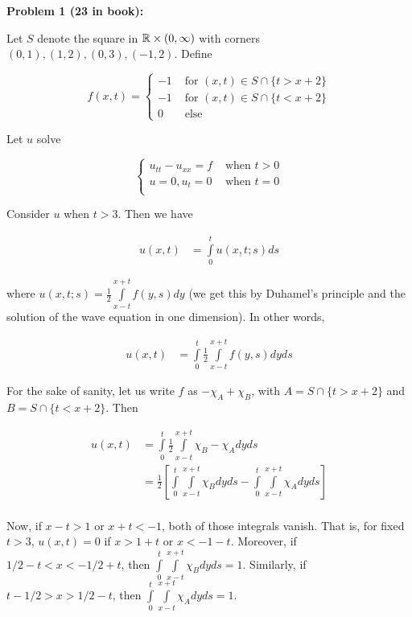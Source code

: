 \documentclass[a4paper,12pt]{article}
\begin{document}
{\bf Problem 1 (23 in book):}

Let $S$ denote the square in $\mathbb{R} \times (0,\infty)$ with corners $(0,1),(1,2),(0,3),(-1,2)$. Define

\begin{displaymath}
f(x,t) = 
   \left\{
     \begin{array}{lr}
       -1  & \text{ for } (x,t) \in S \cap \{t > x+2\} \\
       -1 & \text{ for } (x,t) \in S \cap \{t < x+2\} \\
       0 & \text{ else}
     \end{array}
   \right.
\end{displaymath}

Let $u$ solve

\begin{displaymath}
   \left\{
     \begin{array}{lr}
       u_{tt} - u_{xx} = f  & \text{ when } t>0 \\
       u=0, u_t = 0 & \text{ when } t=0 \\
     \end{array}
   \right.
\end{displaymath}

Consider $u$ when $t>3$. Then we have

\begin{align*}
u(x,t) &= \int\limits_0^t u(x,t;s)ds
\end{align*}

where $u(x,t;s) = \frac{1}{2} \int\limits_{x-t}^{x+t} f(y,s) dy$ (we get this by Duhamel's principle and the solution of the wave equation in one dimension). In other words,

\begin{align*}
u(x,t) &= \int\limits_0^t \frac{1}{2} \int\limits_{x-t}^{x+t} f(y,s) dyds
\end{align*}

For the sake of sanity, let us write $f$ as $-\chi_A + \chi_B$, with $A = S \cap \{t > x+2\}$ and $B = S \cap \{t < x+2\}$. Then

\begin{align*}
u(x,t) &= \int\limits_0^t \frac{1}{2} \int\limits_{x-t}^{x+t} \chi_B - \chi_A dyds\\
&= \frac{1}{2} \left[\int\limits_0^t  \int\limits_{x-t}^{x+t} \chi_B dyds  - \int\limits_0^t  \int\limits_{x-t}^{x+t}\chi_A dyds\right]\\
\end{align*}

Now, if $x-t >1$ or $x+t < -1$, both of those integrals vanish. That is, for fixed $t >3$, $u(x,t) = 0$ if $x > 1+t$ or $x < -1-t$. Moreover, if $1/2-t <x < -1/2 + t$, then $\int\limits_0^t  \int\limits_{x-t}^{x+t} \chi_B dyds = 1$. Similarly, if $t-1/2 > x > 1/2 -t$, then $\int\limits_0^t  \int\limits_{x-t}^{x+t} \chi_A dyds = 1$. 
\end{document}
